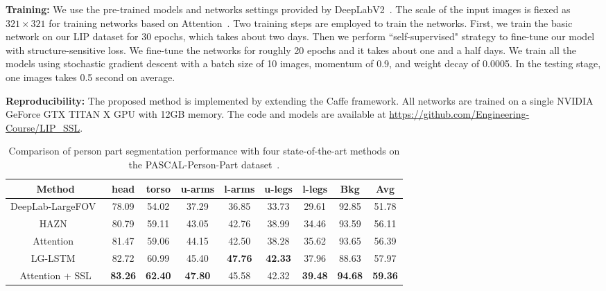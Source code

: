 \documentclass[10pt,twocolumn,letterpaper]{article}
\begin{document}
\textbf{Training: }
We use the pre-trained models and networks settings provided by DeepLabV2~\cite{chen2014semantic}. The scale of the input images is fiexed as $321 \times 321$ for training networks based on Attention~\cite{chen2015attention}. Two training steps are employed to train the networks. First, we train the basic network on our LIP dataset for 30 epochs, which takes about two days. Then we perform ``self-supervised" strategy to fine-tune our model with structure-sensitive loss. We fine-tune the networks for roughly 20 epochs and it takes about one and a half days. We train all the models using stochastic gradient descent with a batch size of 10 images, momentum of 0.9, and weight decay of 0.0005. In the testing stage, one images takes 0.5 second on average.

\textbf{Reproducibility:}
The proposed method is implemented by extending the Caffe framework. All networks are trained on a single NVIDIA GeForce GTX TITAN X GPU with 12GB memory. The code and
models are available at \url{https://github.com/Engineering-Course/LIP_SSL}.

\begin{table}[]
\centering
\scriptsize
\tabcolsep 0.025in 
\begin{tabular}{ccccccccc}
\toprule[0.7pt]
   Method                                     &  head  &  torso  &  u-arms &  l-arms &  u-legs &  l-legs &  Bkg   &  Avg    \\ \hline
   DeepLab-LargeFOV~\cite{chen2014semantic}      & 78.09  &  54.02  &  37.29  &  36.85  &  33.73  &  29.61  &  92.85 &  51.78  \\
   HAZN~\cite{xia2015zoom}                       & 80.79  &  59.11  &  43.05  &  42.76  &  38.99  &  34.46  &  93.59 &  56.11  \\  
   Attention~\cite{chen2015attention}   & 81.47  &  59.06  &  44.15  &  42.50  &  38.28  &  35.62  &  93.65 &  56.39  \\ 
   LG-LSTM~\cite{liang2015semantic}              & 82.72  &  60.99  &  45.40  &  \textbf{47.76}  &  \textbf{42.33}  &  37.96  &  88.63 &  57.97  \\ \hline    
   Attention + SSL                      & \textbf{83.26}  &  \textbf{62.40}  &  \textbf{47.80}  &  45.58  &  42.32 &  \textbf{39.48}  &  \textbf{94.68} 
                                        &  \textbf{59.36}   \\
\toprule[0.7pt]
\end{tabular}
\vspace{-4mm}
\caption{Comparison of person part segmentation performance with four state-of-the-art methods on the PASCAL-Person-Part dataset~\cite{chen2014detect}.}
\vspace{-6mm}
\label{tab: pascal}
\end{table}
\end{document}

